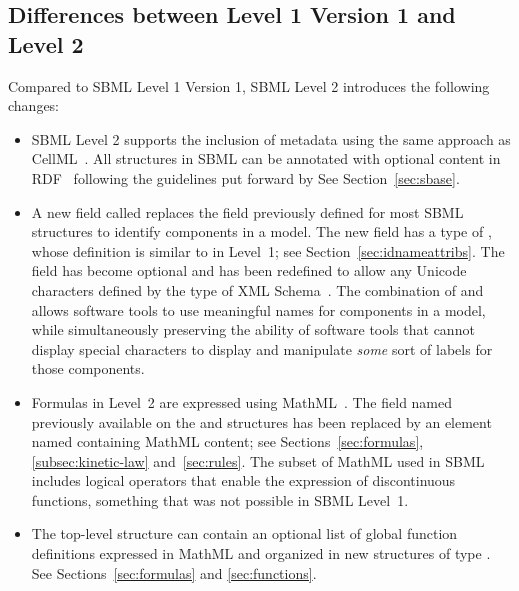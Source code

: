 \documentclass[10pt,twocolumntoc]{cekarticle}
\begin{document}
\subsection{Differences between Level 1 Version 1 and Level 2}

Compared to SBML Level 1 Version 1, SBML Level 2 introduces the following
changes: 
\begin{itemize}
  
\item SBML Level 2 supports the inclusion of metadata using the same approach as
  CellML~\citep{cuellar:2002}.  All structures in SBML can be annotated
  with optional content in RDF~\cite[Resource Description
  Format;][]{lassila:1999} following the guidelines put forward by
  \citeauthor{cuellar:2002}  See Section~\ref{sec:sbase}.
  
\item A new field called  replaces the  field
  previously defined for most SBML structures to identify components in a
  model.  The new  field has a type of , whose
  definition is similar to  in Level~1; see
  Section~\ref{sec:idnameattribs}.  The  field has become
  optional and has been redefined to allow any Unicode characters defined
  by the  type of XML Schema~\citep{biron:2000}.  The
  combination of  and  allows software tools to use
  meaningful names for components in a model, while simultaneously
  preserving the ability of software tools that cannot display special
  characters to display and manipulate \emph{some} sort of labels for those
  components.
  
\item Formulas in Level~2 are expressed using MathML~\citep{w3c:2000b}.
  The field named  previously available on the
   and  structures has been replaced by an
  element named  containing MathML content; see
  Sections~\ref{sec:formulas}, \ref{subsec:kinetic-law}
  and~\ref{sec:rules}.  The subset of MathML used in SBML includes logical
  operators that enable the expression of discontinuous functions,
  something that was not possible in SBML Level~1.
  
\item The top-level  structure can contain an optional list of
  global function definitions expressed in MathML and organized in new
  structures of type .  See
  Sections~\ref{sec:formulas} and \ref{sec:functions}.
  

\end{itemize}
\end{document}
